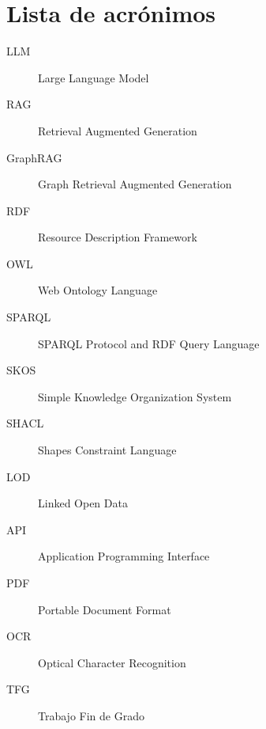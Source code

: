 \chapter*{Lista de acrónimos}

\begin{description}
	\item [LLM] Large Language Model
	\item [RAG] Retrieval Augmented Generation
	\item [GraphRAG] Graph Retrieval Augmented Generation
	\item [RDF] Resource Description Framework
	\item [OWL] Web Ontology Language
	\item [SPARQL] SPARQL Protocol and RDF Query Language
	\item [SKOS] Simple Knowledge Organization System
	\item [SHACL] Shapes Constraint Language
	\item [LOD] Linked Open Data
	\item [API] Application Programming Interface
	\item [PDF] Portable Document Format
	\item [OCR] Optical Character Recognition
	\item [TFG] Trabajo Fin de Grado
\end{description}
